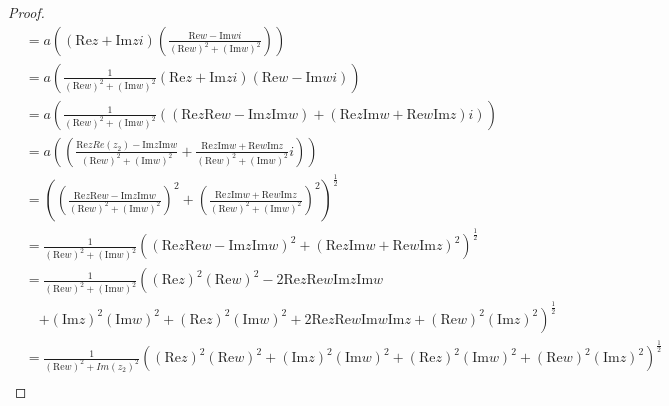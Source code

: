 \documentclass[dvipdfmx]{jsarticle}
\begin{document}
\begin{proof}
\begin{align*}
&= a\left( \left( \mathrm{Re}z + \mathrm{Im}zi \right)\left( \frac{\mathrm{Re}w - \mathrm{Im}wi}{\left( \mathrm{Re}w \right)^{2} + \left( \mathrm{Im}w \right)^{2}} \right) \right)\\
&= a\left( \frac{1}{\left( \mathrm{Re}w \right)^{2} + \left( \mathrm{Im}w \right)^{2}}\left( \mathrm{Re}z + \mathrm{Im}zi \right)\left( \mathrm{Re}w - \mathrm{Im}wi \right) \right)\\
&= a\left( \frac{1}{\left( \mathrm{Re}w \right)^{2} + \left( \mathrm{Im}w \right)^{2}}\left( \left( \mathrm{Re}z\mathrm{Re}w - \mathrm{Im}z\mathrm{Im}w \right) + \left( \mathrm{Re}z\mathrm{Im}w + \mathrm{Re}w\mathrm{Im}z \right)i \right) \right)\\
&= a\left( \left( \frac{\mathrm{Re}zRe\left( z_{2} \right) - \mathrm{Im}z\mathrm{Im}w}{\left( \mathrm{Re}w \right)^{2} + \left( \mathrm{Im}w \right)^{2}} + \frac{\mathrm{Re}z\mathrm{Im}w + \mathrm{Re}w\mathrm{Im}z}{\left( \mathrm{Re}w \right)^{2} + \left( \mathrm{Im}w \right)^{2}}i \right) \right)\\
&= \left( \left( \frac{\mathrm{Re}z\mathrm{Re}w - \mathrm{Im}z\mathrm{Im}w}{\left( \mathrm{Re}w \right)^{2} + \left( \mathrm{Im}w \right)^{2}} \right)^{2} + \left( \frac{\mathrm{Re}z\mathrm{Im}w + \mathrm{Re}w\mathrm{Im}z}{\left( \mathrm{Re}w \right)^{2} + \left( \mathrm{Im}w \right)^{2}} \right)^{2} \right)^{\frac{1}{2}}\\
&= \frac{1}{\left( \mathrm{Re}w \right)^{2} + \left( \mathrm{Im}w \right)^{2}}\left( \left( \mathrm{Re}z\mathrm{Re}w - \mathrm{Im}z\mathrm{Im}w \right)^{2} + \left( \mathrm{Re}z\mathrm{Im}w + \mathrm{Re}w\mathrm{Im}z \right)^{2} \right)^{\frac{1}{2}}\\
&= \frac{1}{\left( \mathrm{Re}w \right)^{2} + \left( \mathrm{Im}w \right)^{2}}\left( \left( \mathrm{Re}z \right)^{2}\left( \mathrm{Re}w \right)^{2} - 2\mathrm{Re}z\mathrm{Re}w\mathrm{Im}z\mathrm{Im}w \right. \\
&\quad \left. + \left( \mathrm{Im}z \right)^{2}\left( \mathrm{Im}w \right)^{2} + \left( \mathrm{Re}z \right)^{2}\left( \mathrm{Im}w \right)^{2} + 2\mathrm{Re}z\mathrm{Re}w\mathrm{Im}w\mathrm{Im}z + \left( \mathrm{Re}w \right)^{2}\left( \mathrm{Im}z \right)^{2} \right)^{\frac{1}{2}}\\
&= \frac{1}{\left( \mathrm{Re}w \right)^{2} + {Im\left( z_{2} \right)}^{2}}\left( \left( \mathrm{Re}z \right)^{2}\left( \mathrm{Re}w \right)^{2} + \left( \mathrm{Im}z \right)^{2}\left( \mathrm{Im}w \right)^{2} + \left( \mathrm{Re}z \right)^{2}\left( \mathrm{Im}w \right)^{2} + \left( \mathrm{Re}w \right)^{2}\left( \mathrm{Im}z \right)^{2} \right)^{\frac{1}{2}}\\

\end{align*}
\end{proof}
\end{document}
